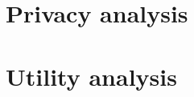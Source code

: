 \documentclass{article}
\begin{document}
\section{Privacy analysis}


\section{Utility analysis}



\end{document}
